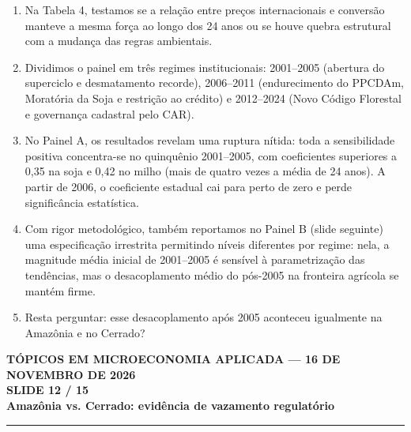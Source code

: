 \documentclass[11pt,a4paper]{article}
\newcommand{\slidenum}{1}
\begin{document}
\vspace{0.8mm}
\begin{enumerate}[leftmargin=*,label=\textbf{(\arabic*)},itemsep=2.8mm,topsep=1mm]
    \item Na Tabela 4, testamos se a relação entre preços internacionais e conversão manteve a mesma força ao longo dos 24 anos ou se houve quebra estrutural com a mudança das regras ambientais.
    \item Dividimos o painel em três regimes institucionais: 2001–2005 (abertura do superciclo e desmatamento recorde), 2006–2011 (endurecimento do PPCDAm, Moratória da Soja e restrição ao crédito) e 2012–2024 (Novo Código Florestal e governança cadastral pelo CAR).
    \item No Painel A, os resultados revelam uma ruptura nítida: toda a sensibilidade positiva concentra-se no quinquênio 2001–2005, com coeficientes superiores a 0,35 na soja e 0,42 no milho (mais de quatro vezes a média de 24 anos). A partir de 2006, o coeficiente estadual cai para perto de zero e perde significância estatística.
    \item Com rigor metodológico, também reportamos no Painel B (slide seguinte) uma especificação irrestrita permitindo níveis diferentes por regime: nela, a magnitude média inicial de 2001–2005 é sensível à parametrização das tendências, mas o desacoplamento médio do pós-2005 na fronteira agrícola se mantém firme.
    \item Resta perguntar: esse desacoplamento após 2005 aconteceu igualmente na Amazônia e no Cerrado?
\end{enumerate}

\newpage

\renewcommand{\slidenum}{12}
\noindent
\begin{minipage}{\textwidth}
\begin{center}
{\color{cinza}\footnotesize\textbf{TÓPICOS EM MICROECONOMIA APLICADA --- 16 DE NOVEMBRO DE 2026}\\[1.2mm]}
{\color{cinza}\bfseries\Large SLIDE 12 / 15\\[1.5mm]}
{\color{verde}\bfseries\LARGE Amazônia vs. Cerrado: evidência de vazamento regulatório\\[2.5mm]}
\rule{\textwidth}{1pt}
\end{center}
\end{minipage}
\vspace{1.5mm}
\end{document}
